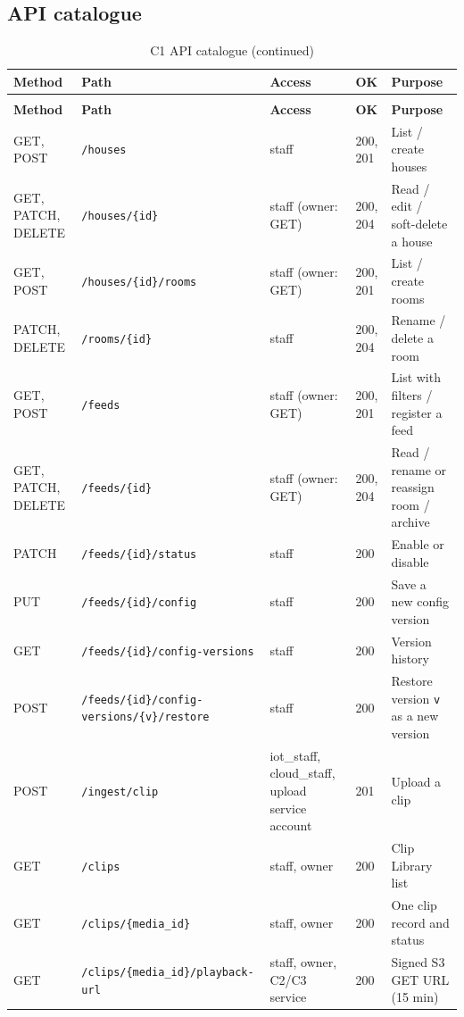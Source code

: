\subsection{API catalogue}
\begin{longtable}{L{1.3cm}L{4.9cm}L{2.8cm}L{1.2cm}L{4.4cm}}
\caption{C1 API catalogue}\label{tab:c1-catalogue}\\
\toprule
\textbf{Method} & \textbf{Path} & \textbf{Access} & \textbf{OK} & \textbf{Purpose} \\
\midrule
\endfirsthead
\caption[]{C1 API catalogue (continued)}\\
\toprule
\textbf{Method} & \textbf{Path} & \textbf{Access} & \textbf{OK} & \textbf{Purpose} \\
\midrule
\endhead
GET, POST & \texttt{/houses} & staff & 200, 201 & List / create houses \\
GET, PATCH, DELETE & \texttt{/houses/\{id\}} & staff (owner: GET) & 200, 204 & Read / edit / soft-delete a house \\
GET, POST & \texttt{/houses/\{id\}/rooms} & staff (owner: GET) & 200, 201 & List / create rooms \\
PATCH, DELETE & \texttt{/rooms/\{id\}} & staff & 200, 204 & Rename / delete a room \\
GET, POST & \texttt{/feeds} & staff (owner: GET) & 200, 201 & List with filters / register a feed \\
GET, PATCH, DELETE & \texttt{/feeds/\{id\}} & staff (owner: GET) & 200, 204 & Read / rename or reassign room / archive \\
PATCH & \texttt{/feeds/\{id\}/status} & staff & 200 & Enable or disable \\
PUT & \texttt{/feeds/\{id\}/config} & staff & 200 & Save a new config version \\
GET & \texttt{/feeds/\{id\}/config-versions} & staff & 200 & Version history \\
POST & \texttt{/feeds/\{id\}/\allowbreak config-versions/\allowbreak\{v\}/restore} & staff & 200 & Restore version \texttt{v} as a new version \\
POST & \texttt{/ingest/clip} & iot\_staff, cloud\_staff, upload service account & 201 & Upload a clip \\
GET & \texttt{/clips} & staff, owner & 200 & Clip Library list \\
GET & \texttt{/clips/\{media\_id\}} & staff, owner & 200 & One clip record and status \\
GET & \texttt{/clips/\{media\_id\}/\allowbreak playback-url} & staff, owner, C2/C3 service & 200 & Signed S3 GET URL (15 min) \\
\bottomrule
\end{longtable}


